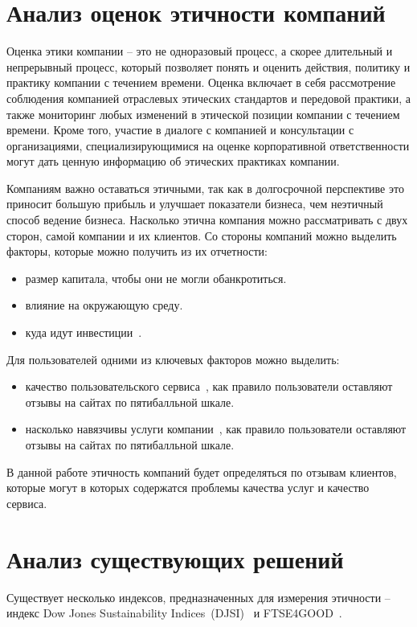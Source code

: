 \documentclass[PI, VKR]{HSEUniversity}
\begin{document}
\section{Анализ оценок этичности компаний}
\label{sec:org0d6ebb1}
Оценка этики компании -- это не одноразовый процесс, а скорее длительный и непрерывный процесс, который позволяет понять и оценить действия, политику и практику компании с течением времени. Оценка включает в себя рассмотрение соблюдения компанией отраслевых этических стандартов и передовой практики, а также мониторинг любых изменений в этической позиции компании с течением времени. Кроме того, участие в диалоге с компанией и консультации с организациями, специализирующимися на оценке корпоративной ответственности могут дать ценную информацию об этических практиках компании.

Компаниям важно оставаться этичными, так как в долгосрочной перспективе это приносит большую прибыль и улучшает показатели бизнеса, чем неэтичный способ ведение бизнеса\autocites{climent_ethical_2018}[][]{mure_esg_2021}. Насколько этична компания можно рассматривать с двух сторон, самой компании и их клиентов. Со стороны компаний можно выделить факторы, которые можно получить из их отчетности:
\begin{itemize}
\item размер капитала, чтобы они не могли обанкротиться.
\item влияние на окружающую среду.
\item куда идут инвестиции~\autocite{harvey_ethical_1995}.
\end{itemize}
Для пользователей одними из ключевых факторов можно выделить:
\begin{itemize}
\item качество пользовательского сервиса~\autocite{brunk_exploring_2010}, как правило пользователи оставляют отзывы на сайтах по пятибалльной шкале.
\item насколько навязчивы услуги компании~\autocite{mitchell_bank_1992}, как правило пользователи оставляют отзывы на сайтах по пятибалльной шкале.
\end{itemize}

В данной работе этичность компаний будет определяться по отзывам клиентов, которые могут в которых содержатся проблемы качества услуг и качество сервиса.
\section{Анализ существующих решений}
\label{sec:org9a83bbc}
Существует несколько индексов, предназначенных для измерения этичности -- индекс Dow Jones Sustainability Indices~(DJSI)~\autocite{lopez_sustainable_2007} и FTSE4GOOD~\autocite{collison_financial_2008}.
\end{document}
